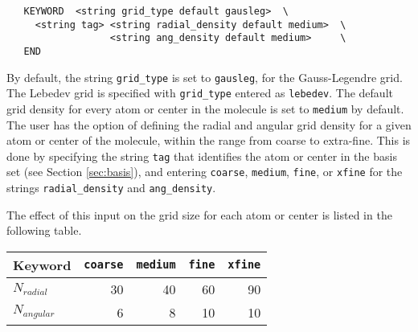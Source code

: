 \begin{verbatim}
   KEYWORD  <string grid_type default gausleg>  \
     <string tag> <string radial_density default medium>  \
                  <string ang_density default medium>     \
   END
\end{verbatim}

By default, the string \verb+grid_type+ is set to \verb+gausleg+, for the
Gauss-Legendre grid.  The Lebedev grid is specified with \verb+grid_type+
entered as \verb+lebedev+.  The default grid density for every atom or
center in the molecule is set to \verb+medium+ by default.  The user has the
option of defining the radial and angular grid density for a given atom 
or center of the molecule, within
the range from coarse to extra-fine.  This is done by specifying the string 
\verb+tag+ that identifies the atom or center in the basis set (see Section
\ref{sec:basis}), and entering \verb+coarse+, \verb+medium+, \verb+fine+,
or \verb+xfine+ for the strings \verb+radial_density+ and \verb+ang_density+.


The effect of this input on the grid size for each atom or center is listed
in the following table.


  \begin{tabular}[right]{|l|r r r r|} \hline
Keyword & {\tt coarse} & {\tt medium} & {\tt fine} & {\tt xfine} \\ \hline
$N_{radial}$ & 30 & 40 & 60 & 90 \\
$N_{angular}$ & 6 & 8 & 10 & 10 \\  \hline
  \end{tabular}

